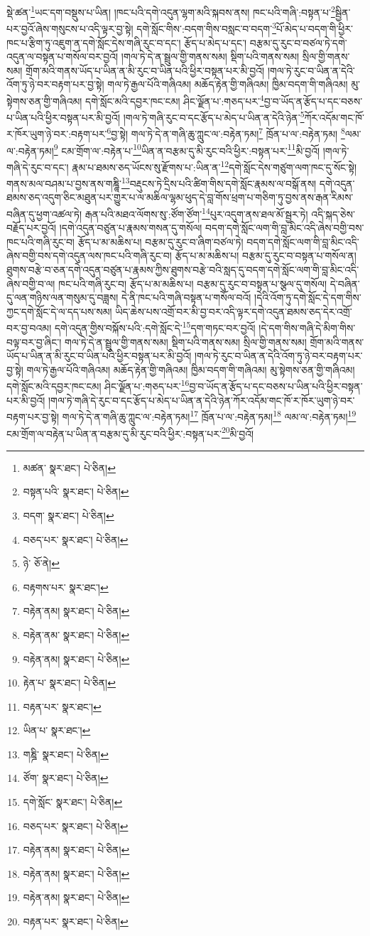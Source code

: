 སྡེ་ཚན་\footnote{མཚན་  སྣར་ཐང་།  པེ་ཅིན། }ཡང་དག་བསྡུས་པ་ཡིན། །ཁང་པའི་དགེ་འདུན་ལྷག་མའི་སྐབས་ནས། ཁང་པའི་གཞི་:བསྟན་པ་\footnote{བསྟན་པའི་  སྣར་ཐང་།  པེ་ཅིན། }སྦྱིན་པར་བྱའོ་ཞེས་གསུངས་པ་འདི་ལྟར་བྱ་སྟེ། དགེ་སློང་གིས་:བདག་གིས་བསླང་བ་བདག་\footnote{བདག་  སྣར་ཐང་།  པེ་ཅིན། }པོ་མེད་པ་བདག་གི་ཕྱིར་ཁང་པ་རྩིག་ཏུ་འཇུག་ན་དགེ་སློང་དེས་གཞི་རུང་བ་དང་། རྩོད་པ་མེད་པ་དང་། བརྩམ་དུ་རུང་བ་བཙལ་ཏེ་དགེ་འདུན་ལ་བསྟན་པ་གསོལ་བར་བྱའོ། །གལ་ཏེ་དེ་ན་སྦྲུལ་གྱི་གནས་སམ། སྡིག་པའི་གནས་སམ། སྲིལ་གྱི་གནས་སམ། གྲོག་མའི་གནས་ཡོད་པ་ཡིན་ན་མི་རུང་བ་ཡིན་པའི་ཕྱིར་བསྟན་པར་མི་བྱའོ། །གལ་ཏེ་རུང་བ་ཡིན་ན་དེའི་འོག་ཏུ་ཉེ་བར་བརྟག་པར་བྱ་སྟེ། གལ་ཏེ་རྒྱལ་པོའི་གཞིའམ། མཆོད་རྟེན་གྱི་གཞིའམ། ཁྱིམ་བདག་གི་གཞིའམ། མུ་སྟེགས་ཅན་གྱི་གཞིའམ། དགེ་སློང་མའི་དབྱར་ཁང་ངམ། ཤིང་ལྗོན་པ་:གཅད་པར་\footnote{བཅད་པར་  སྣར་ཐང་།  པེ་ཅིན། }བྱ་བ་ཡོད་ན་རྩོད་པ་དང་བཅས་པ་ཡིན་པའི་ཕྱིར་བསྟན་པར་མི་བྱའོ། །གལ་ཏེ་གཞི་རུང་བ་དང་རྩོད་པ་མེད་པ་ཡིན་ན་དེའི་ཉེན་\footnote{ཉེ་  ཅོ་ནེ། }ཀོར་འདོམ་གང་ཁོ་ར་ཁོར་ཡུག་ཉེ་བར་:བརྟག་པར་\footnote{བརྟགས་པར་  སྣར་ཐང་། }བྱ་སྟེ། གལ་ཏེ་དེ་ན་གཞི་ཆུ་ཀླུང་ལ་:བརྟེན་ཏམ།\footnote{བརྟེན་ནམ།  སྣར་ཐང་།  པེ་ཅིན། } ཁྲོན་པ་ལ་:བརྟེན་ཏམ། \footnote{བརྟེན་ནམ་  སྣར་ཐང་།  པེ་ཅིན། }ལམ་ལ་:བརྟེན་ཏམ།\footnote{བརྟེན་ནམ།  སྣར་ཐང་།  པེ་ཅིན། } ངམ་གྲོག་ལ་:བརྟེན་པ་\footnote{རྟེན་པ་  སྣར་ཐང་།  པེ་ཅིན། }ཡིན་ན་བརྩམ་དུ་མི་རུང་བའི་ཕྱིར་:བསྟན་པར་\footnote{བརྟན་པར་  སྣར་ཐང་། }མི་བྱའོ། །གལ་ཏེ་གཞི་དེ་རུང་བ་དང་། རྣམ་པ་ཐམས་ཅད་ཡོངས་སུ་རྫོགས་པ་:ཡིན་ན་\footnote{ཡིན་པ་  སྣར་ཐང་། }དགེ་སློང་དེས་གཙུག་ལག་ཁང་དུ་སོང་སྟེ། གནས་མལ་བཤམ་པ་བྱས་ནས་གཎྜཱི་\footnote{གཎྜི་  སྣར་ཐང་།  པེ་ཅིན། }བརྡུངས་ཏེ་དྲིས་པའི་ཚིག་གིས་དགེ་སློང་རྣམས་ལ་བསྒོ་ནས། དགེ་འདུན་ཐམས་ཅད་འདུག་ཅིང་མཐུན་པར་གྱུར་པ་ལ་མཆིལ་ལྷམ་ཕུད་དེ་བླ་གོས་ཕྲག་པ་གཅིག་ཏུ་བྱས་ནས་རྒན་རིམས་བཞིན་དུ་ཕྱག་འཚལ་ཏེ། རྒན་པའི་མཐའ་ལོགས་སུ་:ཙོག་ཙོག་\footnote{ཙོག་  སྣར་ཐང་།  པེ་ཅིན། }པུར་འདུག་ནས་ཐལ་མོ་སྦྱར་ཏེ། འདི་སྐད་ཅེས་བརྗོད་པར་བྱའོ། །དགེ་འདུན་བཙུན་པ་རྣམས་གསན་དུ་གསོལ། བདག་དགེ་སློང་ལག་གི་བླ་མིང་འདི་ཞེས་བགྱི་བས་ཁང་པའི་གཞི་རུང་བ། རྩོད་པ་མ་མཆིས་པ། བརྩམ་དུ་རུང་བ་ཞིག་བཙལ་ཏེ། བདག་དགེ་སློང་ལག་གི་བླ་མིང་འདི་ཞེས་བགྱི་བས་དགེ་འདུན་ལས་ཁང་པའི་གཞི་རུང་བ། རྩོད་པ་མ་མཆིས་པ། བརྩམ་དུ་རུང་བ་བསྟན་པ་གསོལ་ན། ཐུགས་བརྩེ་བ་ཅན་དགེ་འདུན་བཙུན་པ་རྣམས་ཀྱིས་ཐུགས་བརྩེ་བའི་སླད་དུ་བདག་དགེ་སློང་ལག་གི་བླ་མིང་འདི་ཞེས་བགྱི་བ་ལ། ཁང་པའི་གཞི་རུང་བ། རྩོད་པ་མ་མཆིས་པ། བརྩམ་དུ་རུང་བ་བསྟན་པ་སྩལ་དུ་གསོལ། དེ་བཞིན་དུ་ལན་གཉིས་ལན་གསུམ་དུ་བཟླས། དེ་ནི་ཁང་པའི་གཞི་བསྟན་པ་གསོལ་བའོ། །དེའི་འོག་ཏུ་དགེ་སློང་དེ་དག་གིས་ཀྱང་དགེ་སློང་དེ་ལ་དད་པས་སམ། ཡིད་ཆེས་པས་འགྲོ་བར་མི་བྱ་བར་འདི་ལྟར་དགེ་འདུན་ཐམས་ཅད་དེར་འགྲོ་བར་བྱ་བའམ། དགེ་འདུན་གྱིས་བསྐོས་པའི་:དགེ་སློང་དེ་\footnote{དགེ་སློང་  སྣར་ཐང་།  པེ་ཅིན། }དག་གཏང་བར་བྱའོ། །དེ་དག་གིས་གཞི་དེ་མིག་གིས་བལྟ་བར་བྱ་ཞིང་། གལ་ཏེ་དེ་ན་སྦྲུལ་གྱི་གནས་སམ། སྡིག་པའི་གནས་སམ། སྲིལ་གྱི་གནས་སམ། གྲོག་མའི་གནས་ཡོད་པ་ཡིན་ན་མི་རུང་བ་ཡིན་པའི་ཕྱིར་བསྟན་པར་མི་བྱའོ། །གལ་ཏེ་རུང་བ་ཡིན་ན་དེའི་འོག་ཏུ་ཉེ་བར་བརྟག་པར་བྱ་སྟེ། གལ་ཏེ་རྒྱལ་པོའི་གཞིའམ། མཆོད་རྟེན་གྱི་གཞིའམ། ཁྱིམ་བདག་གི་གཞིའམ། མུ་སྟེགས་ཅན་གྱི་གཞིའམ། དགེ་སློང་མའི་དབྱར་ཁང་ངམ། ཤིང་ལྗོན་པ་:གཅད་པར་\footnote{བཅད་པར་  སྣར་ཐང་།  པེ་ཅིན། }བྱ་བ་ཡོད་ན་རྩོད་པ་དང་བཅས་པ་ཡིན་པའི་ཕྱིར་བསྟན་པར་མི་བྱའོ། །གལ་ཏེ་གཞི་དེ་རུང་བ་དང་རྩོད་པ་མེད་པ་ཡིན་ན་དེའི་ཉེན་ཀོར་འདོམ་གང་ཁོ་ར་ཁོར་ཡུག་ཉེ་བར་བརྟག་པར་བྱ་སྟེ། གལ་ཏེ་དེ་ན་གཞི་ཆུ་ཀླུང་ལ་:བརྟེན་ཏམ།\footnote{བརྟེན་ནམ།  སྣར་ཐང་།  པེ་ཅིན། } ཁྲོན་པ་ལ་:བརྟེན་ཏམ།\footnote{བརྟེན་ནམ།  སྣར་ཐང་།  པེ་ཅིན། } ལམ་ལ་:བརྟེན་ཏམ།\footnote{བརྟེན་ནམ།  སྣར་ཐང་།  པེ་ཅིན། } ངམ་གྲོག་ལ་བརྟེན་པ་ཡིན་ན་བརྩམ་དུ་མི་རུང་བའི་ཕྱིར་:བསྟན་པར་\footnote{བརྟན་པར་  སྣར་ཐང་།  པེ་ཅིན། }མི་བྱའོ། 